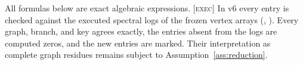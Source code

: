 All formulas below are exact algebraic expressions.
\textsc{[exec]} In v6 every entry is checked against the executed
spectral logs of the frozen vertex arrays
(, ).
Every graph, branch, and key agrees exactly, the entries absent from
the logs are computed zeros, and the new entries are marked.
Their interpretation as complete graph residues remains subject to
Assumption~\ref{ass:reduction}.
